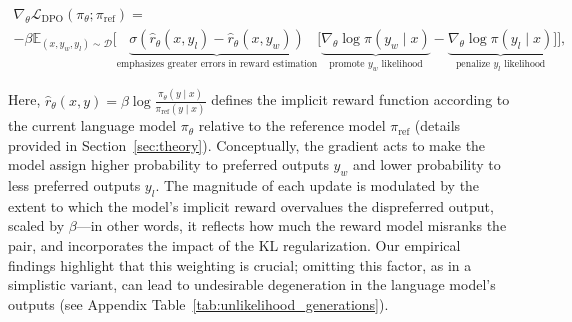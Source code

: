 \begin{multline*}\label{eq:gradient}
    \nabla_\theta \mathcal{L}_\text{DPO}(\pi_\theta;\pi_\text{ref}) = \\ -\beta\mathbb{E}_{(x, y_w, y_l) \sim \mathcal{D}} \bigg[\underbrace{\sigma(\hat{r}_\theta(x, y_l) - \hat{r}_\theta (x, y_w))}_\text{emphasizes greater errors in reward estimation}\bigg[\underbrace{\nabla_\theta\log \pi(y_w \mid x)}_\text{promote $y_w$ likelihood} - \underbrace{\nabla_\theta\log\pi(y_l \mid x)}_\text{penalize $y_l$ likelihood}\bigg]\bigg],
\end{multline*}

Here, $\hat{r}_\theta(x, y) = \beta \log \frac{\pi_\theta(y \mid x)}{\pi_\text{ref}(y \mid x)}$ defines the implicit reward function according to the current language model $\pi_\theta$ relative to the reference model $\pi_\text{ref}$ (details provided in Section~\ref{sec:theory}). Conceptually, the gradient acts to make the model assign higher probability to preferred outputs $y_w$ and lower probability to less preferred outputs $y_l$. The magnitude of each update is modulated by the extent to which the model's implicit reward overvalues the dispreferred output, scaled by $\beta$—in other words, it reflects how much the reward model misranks the pair, and incorporates the impact of the KL regularization. Our empirical findings highlight that this weighting is crucial; omitting this factor, as in a simplistic variant, can lead to undesirable degeneration in the language model's outputs (see Appendix Table~\ref{tab:unlikelihood_generations}).

